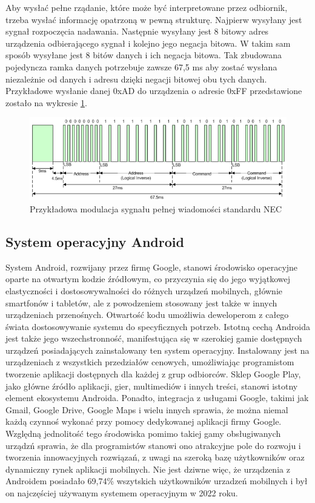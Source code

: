 \documentclass[12pt,twoside]{article}
\begin{document}
Aby wysłać pełne rządanie, które może być interpretowane przez odbiornik, trzeba wysłać informację opatrzoną w pewną strukturę. Najpierw wysyłany jest sygnał rozpoczęcia nadawania. Następnie wysyłany jest 8 bitowy adres urządzenia odbierającego sygnał i kolejno jego negacja bitowa. W takim sam sposób wysyłane jest 8 bitów danych i ich negacja bitowa. Tak zbudowana pojedyncza ramka danych potrzebuje zawsze 67,5 ms aby zostać wysłana niezależnie od danych i adresu dzięki negacji bitowej obu tych danych. Przykładowe wysłanie danej 0xAD do urządzenia o adresie 0xFF przedstawione zostało na wykresie \ref*{Fig:necFrame}.

\begin{figure}[ht]
   \centering
   \includegraphics[width=13cm]{images/necFrame.png}
   \caption{Przykładowa modulacja sygnału pełnej wiadomości standardu NEC\cite{necIR}}
   \label{Fig:necFrame}
\end{figure}

\subsection{System operacyjny Android}
System Android, rozwijany przez firmę Google, stanowi środowisko operacyjne oparte na otwartym kodzie źródłowym,
co przyczynia się do jego wyjątkowej elastyczności i dostosowywalności do różnych urządzeń mobilnych, głównie
smartfonów i tabletów, ale z powodzeniem stosowany jest także w innych urządzeniach przenośnych.
Otwartość kodu umożliwia deweloperom z całego świata dostosowywanie systemu do specyficznych
potrzeb. Istotną cechą Androida jest także jego wszechstronność, manifestująca się w szerokiej gamie dostępnych
urządzeń posiadających zainstalowany ten system operacyjny.
Instalowany jest na urządzeniach z wszystkich przedziałów cenowych, umożliwiając
programistom tworzenie aplikacji dostępnych dla każdej z grup odbiorców. Sklep Google Play, jako główne źródło
aplikacji, gier, multimediów i innych treści, stanowi istotny element ekosystemu Androida. Ponadto, integracja
z usługami Google, takimi jak Gmail, Google Drive, Google Maps i wielu innych sprawia, że można niemal każdą czynnoś wykonać przy pomocy dedykowanej aplikacji firmy Google. Względną jednolitość tego środowiska pomimo takiej gamy obsługiwanych urządzń sprawia, że dla programistów stanowi ono atrakcyjne pole do
rozwoju i tworzenia innowacyjnych rozwiązań, z uwagi na szeroką bazę użytkowników oraz dynamiczny rynek aplikacji mobilnych. Nie jest dziwne więc, że urządzenia z Androidem posiadało 69,74\% wszytskich użytkowników urzadzeń mobilnych i był on najczęściej używanym systemem operacyjnym w 2022 roku\cite{androidStats}.
\end{document}
